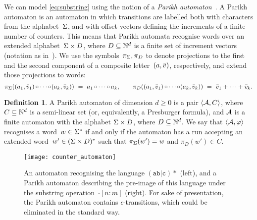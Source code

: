 \documentclass[acmsmall,review,anonymous,screen]{acmart}\settopmatter{printfolios=true,printccs=true,printacmref=true}
\theoremstyle{definition}
\newtheorem{definition}{Definition}[section]
\begin{document}
We can model \eqref{eq:substring} using the notion of a \emph{Parikh
  automaton}~\cite{parikh-automata,expressiveness}. A Parikh automaton
is an automaton in which transitions are labelled both with characters
from the alphabet~$\Sigma$, and with offset vectors defining the
increments of a finite number of counters. This means that Parikh
automata recognise words over an extended
alphabet~$\Sigma \times D$, where $D \subseteq \mathbb{N}^d$ is a
finite set of increment vectors (notation as
in~\cite{expressiveness}). We use the symbols~$\pi_\Sigma, \pi_D$
to denote projections to the first and the second component of a
composite letter~$(a, \bar{v})$, respectively, and extend those
projections to words:
\begin{equation*}
  \pi_\Sigma((a_1, \bar{v}_1) \operatorname{\circ} \cdots \operatorname{\circ} (a_k, \bar{v}_k))
  ~=~ a_1 \operatorname{\circ} \cdots \operatorname{\circ} a_k,
  \qquad
  \pi_D((a_1, \bar{v}_1) \operatorname{\circ} \cdots \operatorname{\circ} (a_k, \bar{v}_k))
  ~=~ \bar{v}_1 + \cdots + \bar{v}_k.
\end{equation*}

\begin{definition}\label{def:parikh-automata} A Parikh automaton of dimension $d
  \geq 0$ is a pair $\left\langle\mathcal{A}, C\right\rangle$, where
  $C \subseteq \mathbb{N}^d$ is a semi-linear set (or, equivalently, a
  Presburger formula), and $\mathcal{A}$ is a finite automaton with the
  alphabet $\Sigma \times D$, where $D \subseteq \mathbb{N}^d$. We
  say that $\left\langle\mathcal{A}, \varphi\right\rangle$ recognises a
  word~$w \in \Sigma^*$ if and only if the automaton has a run
  accepting an extended word~$w' \in (\Sigma \times D)^*$ such that
  $\pi_\Sigma(w') = w$ and $\pi_D(w') \in C$.
\end{definition}

    
\begin{figure}[t]
  \centering
  \hfill
  \texttt{[image: counter\_automaton]}
  \caption{An automaton recognising the language $\mathtt{(ab|c)*}$
    (left), and a Parikh automaton describing the pre-image of this
    language under the substring operation~$\cdot[n:m]$ (right). For
    sake of presentation, the Parikh automaton contains
    $\epsilon$-transitions, which could be eliminated in the standard
    way.}\label{fig:parikh-automata}
    \end{figure}
\end{document}
